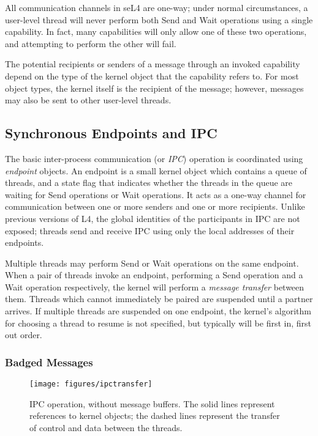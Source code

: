 All communication channels in seL4 are one-way; under normal circumstances, a
user-level thread will never perform both Send and Wait operations using a
single capability. In fact, many capabilities will only allow one of these two
operations, and attempting to perform the other will fail.

The potential recipients or senders of a message through an invoked capability
depend on the type of the kernel object that the capability refers to. For
most object types, the kernel itself is the recipient of the message; however,
messages may also be sent to other user-level threads.

\subsection[ipc]{Synchronous Endpoints and IPC}

The basic inter-process communication (or \emph{IPC}) operation is coordinated
using \emph{endpoint} objects. An endpoint is a small kernel object which
contains a queue of threads, and a state flag that indicates whether the
threads in the queue are waiting for Send operations or Wait operations. It
acts as a one-way channel for communication between one or more senders and
one or more recipients. Unlike previous versions of L4, the global identities
of the participants in IPC are not exposed; threads send and receive IPC using
only the local addresses of their endpoints.

Multiple threads may perform Send or Wait operations on the same endpoint.
When a pair of threads invoke an endpoint, performing a Send operation and a
Wait operation respectively, the kernel will perform a \emph{message transfer}
between them. Threads which cannot immediately be paired are suspended until a
partner arrives. If multiple threads are suspended on one endpoint, the
kernel's algorithm for choosing a thread to resume is not specified, but
typically will be first in, first out order.

\subsubsection{Badged Messages}

\begin{figure}
\centering \texttt{[image: figures/ipctransfer]}
\caption[ipctransfer]{IPC operation, without message buffers. The solid lines represent
references to kernel objects; the dashed lines represent the transfer of
control and data between the threads.}
\end{figure}

